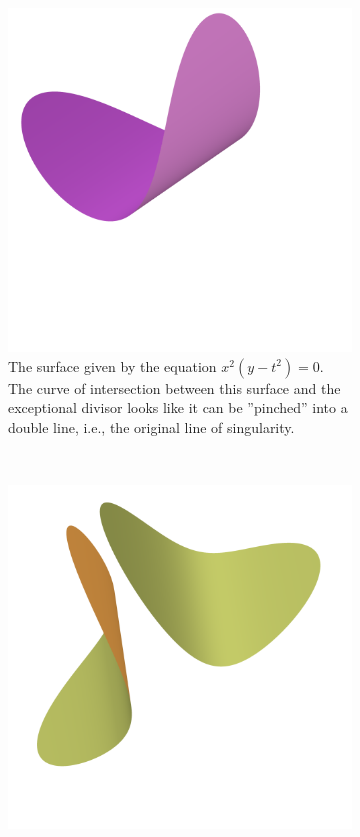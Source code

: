\documentclass{article}
\begin{document}
\begin{example}
    \begin{figure}[h!]
        \centering
        \begin{subfigure}[t]{0.3\textwidth}
            \includegraphics[width=\textwidth]{../pictures/line_blowup_affine_1.png}
            \caption{The surface given by the equation $x^2(y - t^2) = 0$. The
            curve of intersection between this surface and the exceptional
            divisor looks like it can be ''pinched'' into a double line, i.e., the
            original line of singularity.}
        \end{subfigure}
        ~
        \begin{subfigure}[t]{0.3\textwidth}
            \includegraphics[width=\textwidth]{../pictures/line_blowup_affine_2.png} 

\end{subfigure}
\end{figure}
\end{example}
\end{document}
